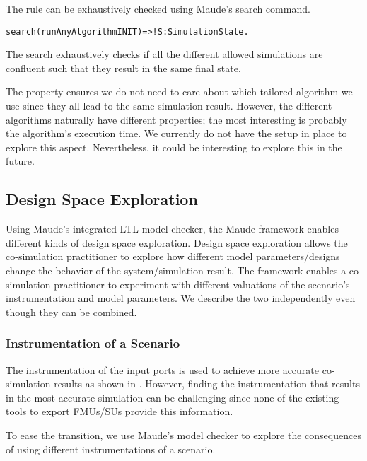 The rule can be exhaustively checked using Maude's search command.



\begin{alltt}
  search (runAnyAlgorithm INIT)  =>! S:SimulationState . 
\end{alltt}

The search exhaustively checks if all the different allowed simulations are confluent such that they result in the same final state.

The property ensures we do not need to care about which tailored algorithm we use since they all lead to the same simulation result.
However, the different algorithms naturally have different properties; the most interesting is probably the algorithm's execution time. 
We currently do not have the setup in place to explore this aspect.
Nevertheless, it could be interesting to explore this in the future.


\subsection{Design Space Exploration}
Using Maude's integrated LTL model checker, the Maude framework enables different kinds of design space exploration.
Design space exploration allows the co-simulation practitioner to explore how different model parameters/designs change the behavior of the system/simulation result.
The framework enables a co-simulation practitioner to experiment with different valuations of the scenario's instrumentation and model parameters.
We describe the two independently even though they can be combined.

\subsubsection{Instrumentation of a Scenario}
The instrumentation of the input ports is used to achieve more accurate co-simulation results as shown in \cite{Gomes2019,Oakes2021,hansen_verification_2021}.
However, finding the instrumentation that results in the most accurate simulation can be challenging since none of the existing tools to export FMUs/SUs provide this information.

To ease the transition, we use Maude's model checker to explore the consequences of using different instrumentations of a scenario.


